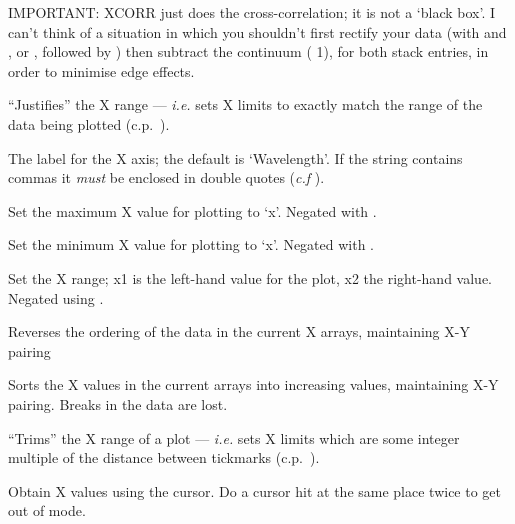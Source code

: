 \begin {description}
IMPORTANT: XCORR just does the cross-correlation; it is not a
`black box'. I can't think of a situation in which you shouldn't first
rectify your data (with   and ,  or ,  followed by )  then
subtract the continuum ( 1), for both stack entries, in order to
minimise edge effects.

``Justifies'' the X range --- {\em i.e.} sets X limits to exactly
match the range of the data being plotted (c.p.\ ). 

The label for the X axis; the default is `Wavelength'. If the string
contains commas it {\em must} be enclosed in double quotes ({\it c.f}
). 

Set the maximum X value for plotting to `x'.
Negated with . 

Set the minimum X value for plotting to `x'.
Negated with . 

Set the X range; x1 is the left-hand value for the plot, x2 the
right-hand value. Negated using . 

Reverses the ordering of the data in the current X arrays, maintaining
X-Y pairing

Sorts the X values in the current arrays into increasing values,
maintaining X-Y pairing. Breaks in the data are lost.

``Trims'' the X range of a plot --- {\em i.e.} sets X limits which are
some integer multiple of the distance between tickmarks (c.p.\ ). 

Obtain X values using the cursor. Do a cursor hit at the same place
twice to get out of   mode.


\end{description}
